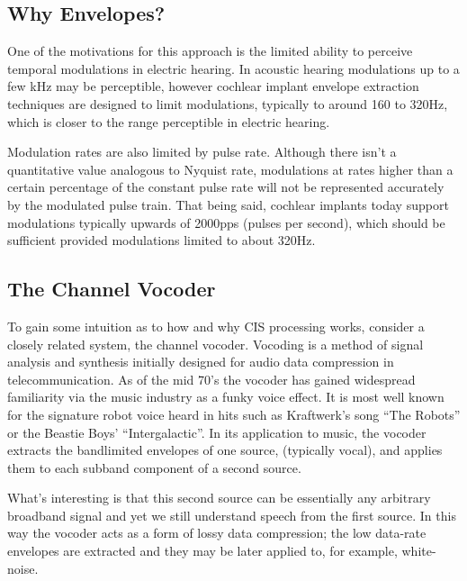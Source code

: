 \documentclass [11pt, proquest,oneside] {ganter_thesis}[2015/03/03]
\begin{document}

\subsection{Why Envelopes?}

One of the motivations for this approach is the limited ability to perceive temporal modulations in electric hearing.  In acoustic hearing modulations up to a few kHz may be perceptible, however cochlear implant envelope extraction techniques are designed to limit modulations, typically to around 160 to 320Hz, which is closer to the range perceptible in electric hearing.

Modulation rates are also limited by pulse rate.  Although there isn't a quantitative value analogous to Nyquist rate, modulations at rates higher than a certain percentage of the constant pulse rate will not be represented accurately by the modulated pulse train.  That being said, cochlear implants today support modulations typically upwards of 2000pps (pulses per second), which should be sufficient provided modulations limited to about 320Hz.

\subsection{The Channel Vocoder}

To gain some intuition as to how and why CIS processing works, consider a closely related system, the channel vocoder.  Vocoding is a method of signal analysis and synthesis initially designed for audio data compression in telecommunication.  As of the mid 70's the vocoder has gained widespread familiarity via the music industry as a funky voice effect.  It is most well known for the signature robot voice heard in hits such as Kraftwerk's song ``The Robots'' or the Beastie Boys' ``Intergalactic''.  In its application to music, the vocoder extracts the bandlimited envelopes of one source, (typically vocal), and applies them to each subband component of a second source.

What's interesting is that this second source can be essentially any arbitrary broadband signal and yet we still understand speech from the first source.  In this way the vocoder acts as a form of lossy data compression; the low data-rate envelopes are extracted and they may be later applied to, for example, white-noise.
\end{document}
